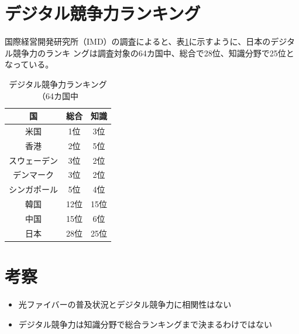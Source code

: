 \documentclass[a4paper,11pt,dvipdfmx]{ujarticle}
\begin{document}
\section{デジタル競争力ランキング}%

国際経営開発研究所（IMD）の調査\cite{imd}によると、表\ref{tbl:mytbl}に示すように、日本のデジタル競争力のランキ
ングは調査対象の64カ国中、総合で28位、知識分野で25位となっている。%

\begin{table}[htbp]
    \centering
    \caption{デジタル競争力ランキング（64カ国中}\label{tbl:mytbl}%
\begin{tabular}{|c|c|c|}
    \hline
    国&総合&知識\\
    \hline
    米国&1位&3位\\
    \hline
    香港&2位&5位\\
    \hline
    スウェーデン&3位&2位\\
    \hline
    デンマーク&3位&2位\\
    \hline
    シンガポール&5位&4位\\
    \hline
    \hline
    韓国&12位&15位\\
    \hline
    中国&15位&6位\\
    \hline
    \hline
    日本&28位&25位\\
    \hline
\end{tabular}
\end{table}

\section{考察}%
\begin{itemize}%
\item 光ファイバーの普及状況とデジタル競争力に相関性はない
\item デジタル競争力は知識分野で総合ランキングまで決まるわけではない%
\end{itemize}%

%


\end{document}
